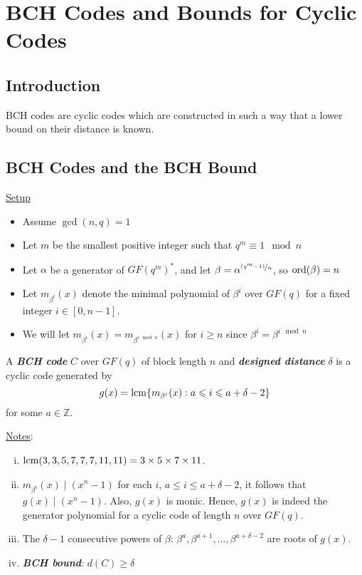 \chapter{BCH Codes and Bounds for Cyclic Codes}
\section{Introduction}
BCH codes are cyclic codes which are constructed in such a way that
a lower bound on their distance is known.

\section{BCH Codes and the BCH Bound}
\underline{Setup}

\begin{itemize}
    \item Assume $ \gcd(n,q)=1 $
    \item Let $ m $ be the smallest positive integer such that $ q^m\equiv 1\mod n $
    \item Let $ \alpha $ be a generator of $ GF(q^m)^* $, and let
          $ \beta=\alpha^{\nicefrac{(q^m-1)}{n}} $, so $ \operatorname{ord}(\beta)=n $
    \item Let $ m_{\beta^i}(x) $ denote the minimal polynomial of
          $ \beta^i $ over $ GF(q) $ for a fixed integer $ i\in[0,n-1] $.
    \item We will let $ m_{\beta^i}(x)=m_{\beta^{i\mod n}}(x) $
          for $ i\geqslant n $ since $ \beta^i=\beta^{i\mod n} $
\end{itemize}

\begin{defbox}
    \begin{definition}
        A \textbf{\emph{BCH code}} $ C $ over $ GF(q) $ of block
        length $ n $ and \textbf{\emph{designed distance}} $ \delta $
        is a cyclic code generated by
        \[ g(x)=\operatorname{lcm} \{m_{\beta^i}(x):a\leqslant i\leqslant a+\delta-2\} \]
        for some $ a\in\mathbb{Z} $.
    \end{definition}
\end{defbox}

\underline{Notes}:
\begin{enumerate}[(i)]
    \item $ \operatorname{lcm}(3,3,5,7,7,7,11,11)=3\times 5\times 7\times 11 $.
    \item $ m_{\beta^i}(x)\mid (x^n-1) $ for each $ i $,
          $ a\leqslant i\leqslant a+\delta-2 $, it follows that $ g(x)\mid (x^n-1) $.
          Also, $ g(x) $ is monic. Hence, $ g(x) $ is indeed the generator polynomial
          for a cyclic code of length $ n $ over $ GF(q) $.
    \item The $ \delta-1 $ consecutive powers of $ \beta $:
          $ \beta^a,\beta^{a+1},\ldots ,\beta^{a+\delta-2} $
          are roots of $ g(x) $.
    \item \textbf{\emph{BCH bound}}: $ d(C)\geqslant \delta $
\end{enumerate}

